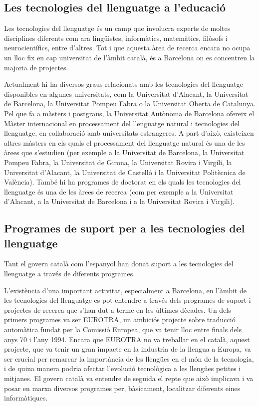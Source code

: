 \begin{multicols}{2}
\subsection{Les tecnologies del llenguatge a l’educació}

Les tecnologies del llenguatge és un camp que involucra experts de moltes disciplines diferents com ara lingüistes, informàtics, matemàtics, filòsofs i neurocientífics, entre d’altres. Tot i que aquesta àrea de recerca encara no ocupa un lloc fix en cap universitat de l’àmbit català, és a Barcelona on es concentren la majoria de projectes. 


Actualment hi ha diversos graus relacionats amb les tecnologies del llenguatge disponibles en algunes universitats, com la Universitat d’Alacant, la Universitat de Barcelona, la Universitat Pompeu Fabra o la Universitat Oberta de Catalunya.
Pel que fa a màsters i postgraus, la Universitat Autònoma de Barcelona ofereix el Màster internacional en processament del llenguatge natural i tecnologies del llenguatge, en coŀlaboració amb universitats estrangeres. A part d’això, existeixen altres màsters en els quals el processament del llenguatge natural és una de les àrees que s’estudien (per exemple a la Universitat de Barcelona, la Universitat Pompeu Fabra, la Universitat de Girona, la Universitat Rovira i Virgili, la Universitat d’Alacant, la Universitat de Castelló i la Universitat Politècnica de València). 
També hi ha programes de doctorat en els quals les tecnologies del llenguatge  és una de les àrees de recerca (com per exemple a la Universitat d’Alacant, a la Universitat de Barcelona i a la Universitat Rovira i Virgili).

\subsection{Programes de suport per a les tecnologies del llenguatge}

Tant el govern català com l’espanyol han donat suport a les tecnologies del llenguatge a través de diferents programes. 

L’existència d’una important activitat, especialment a Barcelona, en l’àmbit de les tecnologies del llenguatge es pot entendre a través dels programes de suport i projectes de recerca que s’han dut a terme en les últimes dècades. Un dels primers programes va ser EUROTRA, un ambiciós projecte sobre traducció automàtica fundat per la Comissió Europea, que va tenir lloc entre finals dels anys 70 i l’any 1994. Encara que EUROTRA no va treballar en el català, aquest projecte, que va tenir un gran impacte en la industria de la llengua a Europa, va ser crucial per remarcar la importància de les llengües en el món de la tecnologia, i de quina manera podria afectar l’evolució tecnològica a les llengües petites i mitjanes. El govern català va entendre de seguida el repte que això implicava i va posar en marxa diversos programes per, bàsicament, localitzar diferents eines informàtiques. 


\end{multicols}
